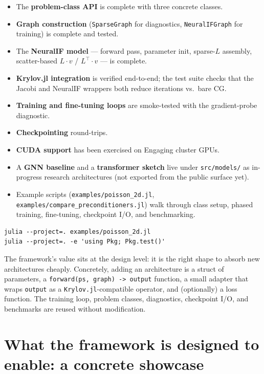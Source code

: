 \documentclass[11pt]{article}
\newcommand{\code}[1]{\texttt{\small #1}}
\begin{document}
\begin{itemize}[leftmargin=*, itemsep=2pt, topsep=2pt]
\item The \textbf{problem-class API} is complete with three concrete classes.
\item \textbf{Graph construction} (\code{SparseGraph} for diagnostics, \code{NeuralIFGraph} for training) is complete and tested.
\item The \textbf{NeuralIF model} --- forward pass, parameter init, sparse-$L$ assembly, scatter-based $L \cdot v$ / $L^\top \cdot v$ --- is complete.
\item \textbf{Krylov.jl integration} is verified end-to-end; the test suite checks that the Jacobi and NeuralIF wrappers both reduce iterations vs.\ bare CG.
\item \textbf{Training and fine-tuning loops} are smoke-tested with the gradient-probe diagnostic.
\item \textbf{Checkpointing} round-trips.
\item \textbf{CUDA support} has been exercised on Engaging cluster GPUs.
\item A \textbf{GNN baseline} and a \textbf{transformer sketch} live under \code{src/models/} as in-progress research architectures (not exported from the public surface yet).
\item Example scripts (\code{examples/poisson\_2d.jl}, \code{examples/compare\_preconditioners.jl}) walk through class setup, phased training, fine-tuning, checkpoint I/O, and benchmarking.
\end{itemize}

\begin{lstlisting}
julia --project=. examples/poisson_2d.jl
julia --project=. -e 'using Pkg; Pkg.test()'
\end{lstlisting}

The framework's value sits at the design level: it is the right shape to absorb new architectures cheaply. Concretely, adding an architecture is a struct of parameters, a \code{forward(ps, graph) -> output} function, a small adapter that wraps \code{output} as a \code{Krylov.jl}-compatible operator, and (optionally) a loss function. The training loop, problem classes, diagnostics, checkpoint I/O, and benchmarks are reused without modification.

\section{What the framework is designed to enable: a concrete showcase}
\end{document}
